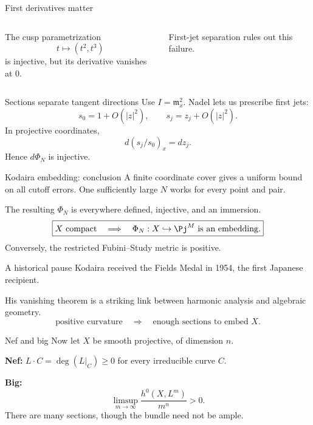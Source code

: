 \begin{frame}{First derivatives matter}
\begin{columns}[c]
\centering
{}
The cusp parametrization
\[
t\longmapsto(t^2,t^3)
\]
is injective, but its derivative vanishes at \(0\).
\medskip
\par First-jet separation rules out this failure.
\end{columns}
\end{frame}

\begin{frame}{Sections separate tangent directions}
Use \(I=\mathfrak m_x^2\). Nadel lets us prescribe first jets:
\[
s_0=1+O(|z|^2),\qquad
s_j=z_j+O(|z|^2).
\]
In projective coordinates,
\[
\boxed{d(s_j/s_0)_x=dz_j.}
\]
Hence \(d\Phi_N\) is injective.
\end{frame}

\begin{frame}{Kodaira embedding: conclusion}
A finite coordinate cover gives a uniform bound on all cutoff errors.
One sufficiently large \(N\) works for every point and pair.
\bigskip
\par The resulting \(\Phi_N\) is everywhere defined, injective, and an immersion.
\[
\boxed{X\ \text{compact}\quad\Longrightarrow\quad
\Phi_N:X\hookrightarrow\Pj^M\ \text{is an embedding}.}
\]
Conversely, the restricted Fubini--Study metric is positive.
\end{frame}

\begin{frame}{A historical pause}
Kodaira received the Fields Medal in 1954, the first Japanese recipient.
\bigskip
\par His vanishing theorem is a striking link between harmonic analysis and algebraic geometry.
\[
\text{positive curvature}\quad\Longrightarrow\quad
\text{enough sections to embed }X.
\]
\end{frame}

\begin{frame}{Nef and big}
Now let \(X\) be smooth projective, of dimension \(n\).
\bigskip
\par \textbf{Nef:} \(L\cdot C=\deg(L|_C)\ge0\) for every irreducible curve \(C\).
\bigskip
\par \textbf{Big:}
\[
\limsup_{m\to\infty}\frac{h^0(X,L^m)}{m^n}>0.
\]
There are many sections, though the bundle need not be ample.
\end{frame}


